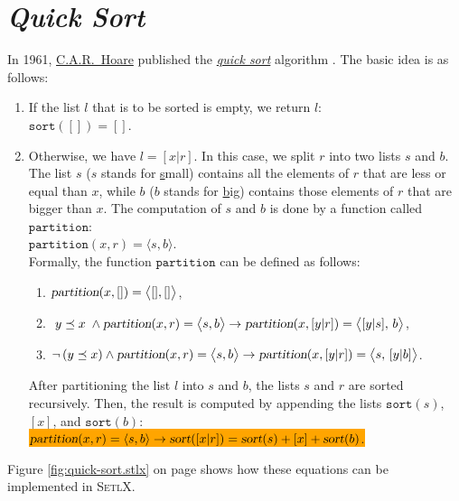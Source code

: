 \section{\emph{Quick Sort}}
In 1961, \href{http://en.wikipedia.org/wiki/Tony_Hoare}{C.A.R.~Hoare} published the
\href{http://en.wikipedia.org/wiki/Quicksort}{\emph{quick sort}}  
algorithm \cite{hoare:61}.  The basic idea is as follows:
\begin{enumerate}
\item If the list $l$ that is to be sorted is empty, we return $l$: 
      \\[0.2cm]
      \hspace*{1.3cm} $\mathtt{sort}([]) = []$.
\item Otherwise, we have $l = [x|r]$.  In this case, we split $r$ into two lists $s$ and $b$.
      The list $s$ ($s$ stands for \underline{s}mall) contains all the elements of $r$ that are less
      or equal than $x$,     while $b$ ($b$ stands for \underline{b}ig) contains
      those elements of $r$ that are bigger than $x$.  The computation of $s$ and $b$ is done by a
      function called $\mathtt{partition}$: 
      \\[0.2cm]
      \hspace*{1.3cm}
      $\texttt{partition}(x,r) = \langle s,b \rangle$.
      \\[0.2cm]
      Formally, the function $\texttt{partition}$ can be defined as follows:
      \begin{enumerate}
      \item $\textsl{partition}(x, []) = \bigl\langle[], []\bigr\rangle$,
      \item \quad 
            $\; y \preceq x\; \wedge \textsl{partition}(x,r) = \bigl\langle s, b \bigr\rangle \rightarrow 
             \textsl{partition}(x, [y|r]) = \bigl\langle [y| s],\, b \bigr\rangle$,
      \item $\neg\, (y \preceq x) \wedge \textsl{partition}(x,r) = \bigl\langle s, b \bigr\rangle \rightarrow 
             \textsl{partition}(x, [y|r]) = \bigl\langle s,\, [y|b] \bigr\rangle$.
      \end{enumerate}
      After partitioning the list $l$ into $s$ and $b$, the lists $s$ and $r$ are sorted
      recursively.  Then, the result is computed by appending the lists $\mathtt{sort}(s)$,
      $[x]$, and $\mathtt{sort}(b)$:
      \\[0.2cm]
      \hspace*{1.3cm}
     \colorbox{orange}{$\textsl{partition}(x,r) = \langle s,b \rangle \rightarrow 
       \textsl{sort}([x|r]) = \textsl{sort}(s) + [x] + \textsl{sort}(b)$.}
\end{enumerate}
Figure \ref{fig:quick-sort.stlx} on page \pageref{fig:quick-sort.stlx} shows how these equations can
be implemented in \textsc{SetlX}.

